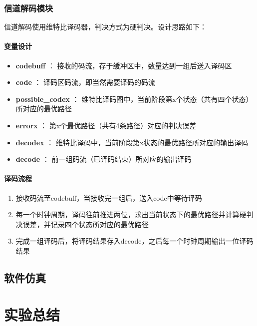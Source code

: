 \documentclass[UTF8]{ctexart}
\begin{document}
\subsubsection{信道解码模块}

信道解码使用维特比译码器，判决方式为硬判决。设计思路如下：

\paragraph{变量设计}

\begin{itemize}
\item \textbf{codebuff} ： 接收的码流，存于缓冲区中，数量达到一组后送入译码区
\item \textbf{code} ： 译码区码流，即当然需要译码的码流
\item \textbf{possible\_codex} ： 维特比译码图中，当前阶段第x个状态（共有四个状态）所对应的最优路径
\item \textbf{errorx} ： 第x个最优路径（共有4条路径）对应的判决误差
\item \textbf{decodex} ： 维特比译码中，当前阶段第x状态的最优路径所对应的输出译码
\item \textbf{decode} ： 前一组码流（已译码结束）所对应的输出译码
\end{itemize}

\paragraph{译码流程}

\begin{enumerate}
\item 接收码流至codebuff，当接收完一组后，送入code中等待译码
\item 每一个时钟周期，译码往前推进两位，求出当前状态下的最优路径并计算硬判决误差，并记录四个状态所对应的最优路径
\item 完成一组译码后，将译码结果存入decode，之后每一个时钟周期输出一位译码结果
\end{enumerate}

\subsection{软件仿真}

\section{实验总结}
\end{document}
